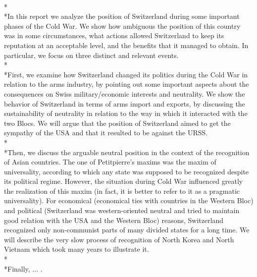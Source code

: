 \documentclass[a4paper]{article}
\begin{document}
\\*\\*In this report we analyze the position of Switzerland during some important phases of the Cold War. We show how ambiguous the position of this country was in some circumstances, what actions allowed Switzerland to keep its reputation at an acceptable level, and the benefits that it managed to obtain. In particular, we focus on three distinct and relevant events.
\\*\\*First, we examine how Switzerland changed its politics during the Cold War in relation to the arms industry, by pointing out some important aspects about the consequences on Swiss military/economic interests and neutrality. We show the behavior of Switzerland in terms of arms import and exports, by discussing the sustainability of neutrality in relation to the way in which it interacted with the two Blocs. We will argue that the position of Switzerland aimed to get the sympathy of the USA and that it resulted to be against the URSS.
\\*\\*Then, we discuss the arguable neutral position in the context of the recognition of Asian countries. The one of Petitpierre's maxims was the maxim of universality, according to which any state was supposed to be recognized despite its political regime. However, the situation during Cold War influenced greatly the realization of this maxim (in fact, it is better to refer to it as a pragmatic universality). For economical (economical ties with countries in the Western Bloc) and political (Switzerland was western-oriented neutral and tried to maintain good relation with the USA and the Western Bloc) reasons, Switzerland recognized only non-communist parts of many divided states for a long time. We will describe the very slow process of recognition of North Korea and North Vietnam which took many years to illustrate it.
\\*\\*Finally, ... .
\clearpage
\end{document}
